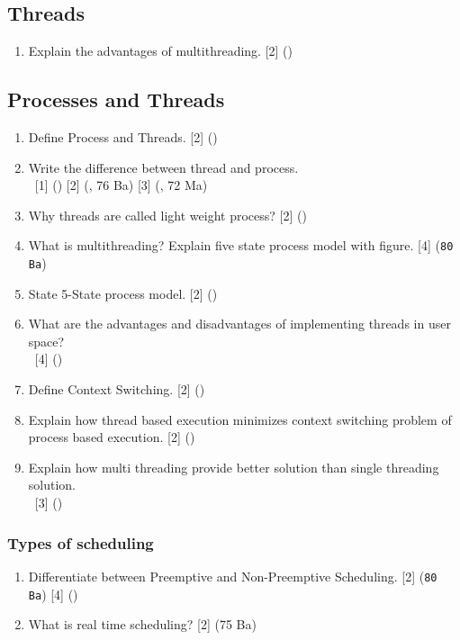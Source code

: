 \documentclass[12pt]{article}
\newcommand{\enter}{\\\textcolor{white}{1}}
\begin{document}
	\subsection{Threads}
		\begin{enumerate}[noitemsep, topsep = 0pt]
			\item Explain the advantages of multithreading. \hfill [2] ()
		\end{enumerate}

	\subsection{Processes and Threads}
		\begin{enumerate}[noitemsep, topsep = 0pt]
			\item Define Process and Threads. \hfill [2] ()
			
			\item Write the difference between thread and process. 
			\enter\hfill [1] () [2] (, 76 Ba) [3] (, 72 Ma)
			
			\item Why threads are called light weight process? \hfill [2] ()
			
			\item What is multithreading? Explain five state process model with figure. \hfill [4] (\texttt{80 Ba})
			
			\item State 5-State process model. \hfill [2] ()
			
			\item What are the advantages and disadvantages of implementing threads in user space?
			\enter \hfill [4] ()
			
			\item Define Context Switching. \hfill [2] ()
			
			\item Explain how thread based execution minimizes context switching problem of process based execution. \hfill [2] ()
			
			\item Explain how multi threading provide better solution than single threading solution.
			\enter \hfill [3] ()
		\end{enumerate}

		\subsubsection{Types of scheduling}
			\begin{enumerate}[noitemsep, topsep = 0pt]
				\item Differentiate between Preemptive and Non-Preemptive Scheduling. \hfill [2] (\texttt{80 Ba}) [4] ()
				
				\item What is real time scheduling? \hfill [2] (75 Ba)
			\end{enumerate}
\end{document}
